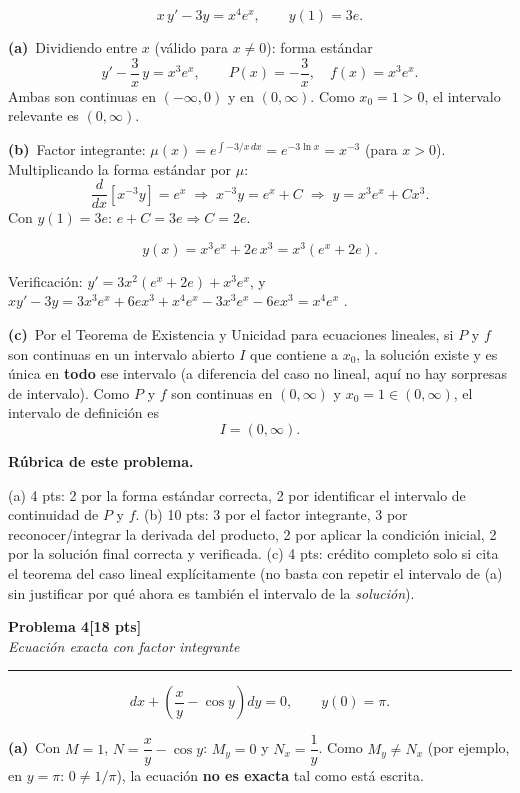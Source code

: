 \documentclass[11pt,letterpaper]{article}
\newcommand{\problema}[3]{%
  \bigskip\bigskip\noindent
  {\Large\textbf{Problema #1}}\hfill\textbf{[#2 pts]}\\[3pt]
  {\small\itshape #3}\par
  \vspace{2pt}\hrule\vspace{8pt}
}
\newcommand{\subparte}[2]{%
  \medskip\noindent\textbf{(#1}\ #2\par\smallskip
}
\newenvironment{resultado}
  {\begin{mdframed}[linecolor=black,linewidth=0.6pt,
    innerleftmargin=6pt,innerrightmargin=6pt,innertopmargin=4pt,innerbottommargin=4pt]
   \bfseries}
  {\end{mdframed}}
\newenvironment{rubrica}{%
  \begin{mdframed}[linecolor=black,linewidth=0.6pt,
    innerleftmargin=8pt,innerrightmargin=8pt,innertopmargin=5pt,innerbottommargin=5pt]
  \small\textbf{Rúbrica de este problema.}\par\smallskip
}{\end{mdframed}}
\begin{document}
\[
x\,y' - 3y = x^4 e^x, \qquad y(1) = 3e.
\]

\subparte{a)}{Dividiendo entre $x$ (válido para $x\neq0$): forma estándar
\[
y' - \frac{3}{x}\,y = x^3 e^x, \qquad P(x) = -\frac{3}{x}, \quad f(x)=x^3e^x.
\]
Ambas son continuas en $(-\infty,0)$ y en $(0,\infty)$. Como $x_0=1>0$, el intervalo relevante es $(0,\infty)$.}

\subparte{b)}{Factor integrante: $\mu(x) = e^{\int -3/x\,dx} = e^{-3\ln x} = x^{-3}$ (para $x>0$).
Multiplicando la forma estándar por $\mu$:
\[
\frac{d}{dx}\left[x^{-3}y\right] = e^x \;\Longrightarrow\; x^{-3}y = e^x + C \;\Longrightarrow\; y = x^3e^x + Cx^3.
\]
Con $y(1)=3e$: $e + C = 3e \Rightarrow C = 2e$.
\begin{resultado}
\[
y(x) = x^3 e^x + 2e\,x^3 = x^3\!\left(e^x+2e\right).
\]
\end{resultado}
Verificación: $y' = 3x^2(e^x+2e)+x^3e^x$, y $xy'-3y = 3x^3e^x+6ex^3+x^4e^x-3x^3e^x-6ex^3 = x^4e^x$ \checkmark.}

\subparte{c)}{Por el Teorema de Existencia y Unicidad para ecuaciones lineales, si $P$ y $f$ son continuas en un intervalo abierto $I$ que contiene a $x_0$, la solución existe y es única en \textbf{todo} ese intervalo (a diferencia del caso no lineal, aquí no hay sorpresas de intervalo). Como $P$ y $f$ son continuas en $(0,\infty)$ y $x_0=1 \in (0,\infty)$, el intervalo de definición es
\[
I = (0,\infty).
\]}

\begin{rubrica}
(a) 4 pts: 2 por la forma estándar correcta, 2 por identificar el intervalo de continuidad de $P$ y $f$. (b) 10 pts: 3 por el factor integrante, 3 por reconocer/integrar la derivada del producto, 2 por aplicar la condición inicial, 2 por la solución final correcta y verificada. (c) 4 pts: crédito completo solo si cita el teorema del caso lineal explícitamente (no basta con repetir el intervalo de (a) sin justificar por qué ahora es también el intervalo de la \emph{solución}).
\end{rubrica}

\newpage
\problema{4}{18}{Ecuación exacta con factor integrante}

\[
dx + \left(\frac{x}{y}-\cos y\right) dy = 0, \qquad y(0)=\pi.
\]

\subparte{a)}{Con $M=1$, $N=\dfrac{x}{y}-\cos y$: $M_y = 0$ y $N_x = \dfrac{1}{y}$. Como $M_y \neq N_x$ (por ejemplo, en $y=\pi$: $0 \neq 1/\pi$), la ecuación \textbf{no es exacta} tal como está escrita.}
\end{document}
